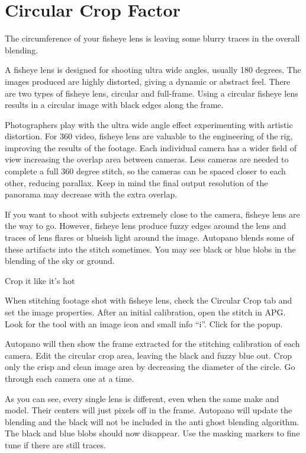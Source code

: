 \chapter{Circular Crop Factor}
\pagecolor{white}
\label{chap:43}
\begin{fullwidth}

\problem

{\large The circumference of your fisheye lens is leaving some blurry traces in the overall blending. \par}

A fisheye lens is designed for shooting ultra wide angles, usually 180 degrees. The images produced are highly distorted, giving a dynamic or abstract feel. There are two types of fisheye lens, circular and full-frame. Using a circular fisheye lens results in a circular image with black edges along the frame.


Photographers play with the ultra wide angle effect experimenting with artistic distortion.  For 360 video, fisheye lens are valuable to the engineering of the rig, improving the results of the footage. Each individual camera has a wider field of view increasing the overlap area between cameras. Less cameras are needed to complete a full 360 degree stitch, so the cameras can be spaced closer to each other, reducing parallax. Keep in mind the final output resolution of the panorama may decrease with the extra overlap. 
\clearpage


If you want to shoot with subjects extremely close to the camera, fisheye lens are the way to go. However, fisheye lens produce fuzzy edges around the lens and traces of lens flares or blueish light around the image. Autopano blends some of these artifacts into the stitch sometimes. You may see black or blue blobs in the blending of the sky or ground.

\solution

{\large Crop it like it’s hot \par}

When stitching footage shot with fisheye lens, check the Circular Crop tab and set the image properties. After an initial calibration, open the stitch in APG. Look for the tool with an image icon and small info “i”. Click for the popup.

\clearpage
Autopano will then show the frame extracted for the stitching calibration of each camera. Edit the circular crop area, leaving the black and fuzzy blue out. Crop only the crisp and clean image area by decreasing the diameter of the circle. Go through each camera one at a time. 


As you can see, every single lens is different, even when the same make and model. Their centers will just pixels off in the frame. Autopano will update the blending and the black will not be included in the anti ghost blending algorithm. The black and blue blobs should now disappear. Use the masking markers to fine tune if there are still traces.

\clearpage
\end{fullwidth}